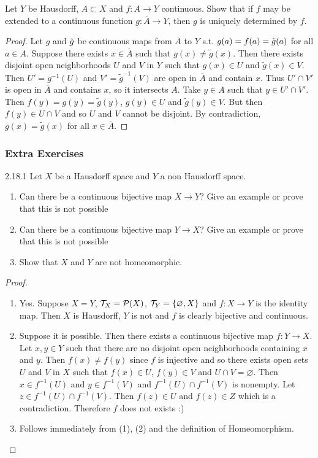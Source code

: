 \begin{ex}{18.13}
    Let $Y$ be Hausdorff, $A\subset X$ and $f:A\to Y$ continuous. Show that if $f$ may be extended to a continuous function $g:\overline{A}\to Y$, then $g$ is uniquely determined by $f$.
\end{ex}
\begin{proof}
    Let $g$ and $\Tilde{g}$ be continuous maps from $\overline{A}$ to $Y$ s.t. $g(a)=f(a)=\Tilde{g}(a)$ for all $a\in A$.
    Suppose there exists $x\in\overline{A}$ such that $g(x)\neq\tilde{g}(x)$.
    Then there exists disjoint open neighborhoods $U$ and $V$ in $Y$ such that $g(x)\in U$ and $\tilde{g}(x)\in V$.
    Then $U'=g^{-1}(U)$ and $V'=\tilde{g}^{-1}(V)$ are open in $\overline{A}$ and contain $x$.
    Thus $U'\cap V'$ is open in $\overline{A}$ and contains $x$, so it intersects $A$. 
    Take $y\in A$ such that $y\in U'\cap V'$. Then $f(y)=g(y)=\tilde{g}(y)$, $g(y)\in U$ and $\tilde{g}(y)\in V$. 
    But then $f(y)\in U\cap V$ and so $U$ and $V$ cannot be disjoint. By contradiction, $g(x)=\tilde{g}(x)$ for all $x\in\overline{A}$. 
\end{proof}

\subsubsection{Extra Exercises}
\begin{ex}{2.18.1}
    Let $X$ be a Hausdorff space and $Y$ a non Hausdorff space.
    \begin{enumerate}
        \item Can there be a continuous bijective map $X\to Y$? Give an example or prove that this is not possible
        \item Can there be a continuous bijective map $Y\to X$? Give an example or prove that this is not possible
        \item Show that $X$ and $Y$ are not homeomorphic.
    \end{enumerate}
\end{ex}
\begin{proof}
    ${}$
    \begin{enumerate}
        \item Yes. Suppose $X=Y$, $\mathcal{T}_X=\mathcal{P}(X)$, $\mathcal{T}_Y=\{\varnothing, X\}$ and $f:X\to Y$ is the identity map.
        Then $X$ is Hausdorff, $Y$ is not and $f$ is clearly bijective and continuous.
        \item Suppose it is possible. Then there exists a continuous bijective map $f:Y\to X$.
        Let $x,y\in Y$ such that there are no disjoint open neighborhoods containing $x$ and $y$.
        Then $f(x)\neq f(y)$ since $f$ is injective and so there exists open sets  $U$ and $V$ in $X$ such that $f(x)\in U$, $f(y)\in V$ and $U\cap V=\varnothing$.
        Then $x\in f^{-1}(U)$ and $y\in f^{-1}(V)$ and $f^{-1}(U)\cap f^{-1}(V)$ is nonempty.
        Let $z\in f^{-1}(U)\cap f^{-1}(V)$. Then $f(z)\in U$ and $f(z)\in Z$ which is a contradiction. Therefore $f$ does not exists :)
        \item Follows immediately from (1), (2) and the definition of Homeomorphism.
    \end{enumerate}
\end{proof}

